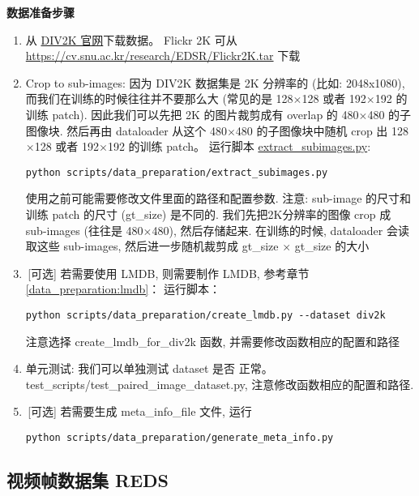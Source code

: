 \documentclass[../main.tex]{subfiles}
\begin{document}
\noindent\textbf{数据准备步骤}
\begin{enumerate}
    \item 从 \href{https://data.vision.ee.ethz.ch/cvl/DIV2K}{DIV2K 官网}下载数据。 Flickr 2K 可从 \url{https://cv.snu.ac.kr/research/EDSR/Flickr2K.tar} 下载
    \item Crop to sub-images: 因为 DIV2K 数据集是 2K 分辨率的 (比如: 2048x1080), 而我们在训练的时候往往并不要那么大 (常见的是 128$\times$128 或者 192$\times$192 的训练 patch). 因此我们可以先把 2K 的图片裁剪成有 overlap 的 480$\times$480 的子图像块. 然后再由 dataloader 从这个 480$\times$480 的子图像块中随机 crop 出 128$\times$128 或者 192$\times$192 的训练 patch。
          运行脚本 \href{https://github.com/XPixelGroup/BasicSR/blob/master/scripts/data_preparation/extract_subimages.py}{extract\_subimages.py}:
          \begin{verbatim}
python scripts/data_preparation/extract_subimages.py
\end{verbatim}
          使用之前可能需要修改文件里面的路径和配置参数. 注意: sub-image 的尺寸和训练 patch 的尺寸 (gt\_size) 是不同的. 我们先把2K分辨率的图像 crop 成 sub-images (往往是 480$\times$480), 然后存储起来. 在训练的时候, dataloader 会读取这些 sub-images, 然后进一步随机裁剪成 gt\_size $\times$ gt\_size 的大小
    \item\,[可选] 若需要使用 LMDB, 则需要制作 LMDB, 参考章节\ref{data_preparation:lmdb}：
          运行脚本：
          \begin{verbatim}
python scripts/data_preparation/create_lmdb.py --dataset div2k
\end{verbatim}
          注意选择 create\_lmdb\_for\_div2k 函数, 并需要修改函数相应的配置和路径
    \item 单元测试: 我们可以单独测试 dataset 是否 正常。test\_scripts/test\_paired\_image\_dataset.py, 注意修改函数相应的配置和路径.
    \item\,[可选] 若需要生成 meta\_info\_file 文件,
          运行
          \begin{verbatim}
python scripts/data_preparation/generate_meta_info.py
\end{verbatim}
\end{enumerate}

\subsection{视频帧数据集 REDS}
\end{document}
